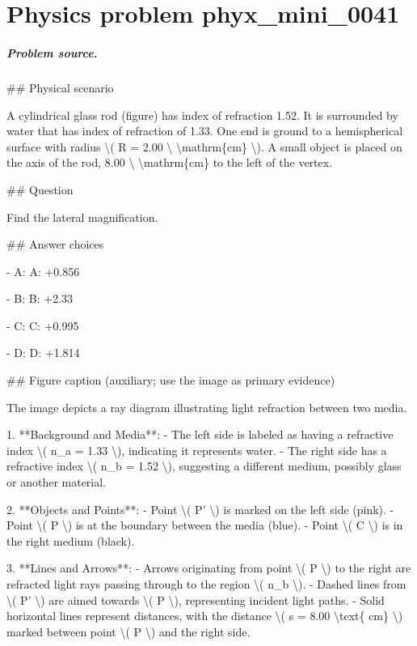 
\chapter{Physics problem phyx\_mini\_0041}
\label{ch:PhyXMiniProblems_problem_phyx_mini_0041}

\paragraph{Problem source.}
\#\# Physical scenario

A cylindrical glass rod (figure) has index of refraction 1.52. It is surrounded by water that has index of refraction of 1.33. One end is ground to a hemispherical surface with radius \textbackslash{}( R = 2.00 \textbackslash{} \textbackslash{}mathrm\{cm\} \textbackslash{}). A small object is placed on the axis of the rod, 8.00 \textbackslash{} \textbackslash{}mathrm\{cm\} to the left of the vertex.

\#\# Question

Find the lateral magnification.

\#\# Answer choices

- A: A: +0.856

- B: B: +2.33

- C: C: +0.995

- D: D: +1.814

\#\# Figure caption (auxiliary; use the image as primary evidence)

The image depicts a ray diagram illustrating light refraction between two media. 

1. **Background and Media**:
   - The left side is labeled as having a refractive index \textbackslash{}( n\_a = 1.33 \textbackslash{}), indicating it represents water.
   - The right side has a refractive index \textbackslash{}( n\_b = 1.52 \textbackslash{}), suggesting a different medium, possibly glass or another material.

2. **Objects and Points**:
   - Point \textbackslash{}( P' \textbackslash{}) is marked on the left side (pink).
   - Point \textbackslash{}( P \textbackslash{}) is at the boundary between the media (blue).
   - Point \textbackslash{}( C \textbackslash{}) is in the right medium (black).

3. **Lines and Arrows**:
   - Arrows originating from point \textbackslash{}( P \textbackslash{}) to the right are refracted light rays passing through to the region \textbackslash{}( n\_b \textbackslash{}).
   - Dashed lines from \textbackslash{}( P' \textbackslash{}) are aimed towards \textbackslash{}( P \textbackslash{}), representing incident light paths.
   - Solid horizontal lines represent distances, with the distance \textbackslash{}( s = 8.00 \textbackslash{}text\{ cm\} \textbackslash{}) marked between point \textbackslash{}( P \textbackslash{}) and the right side.

